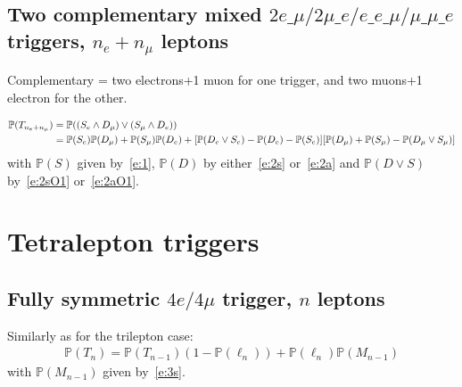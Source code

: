 \documentclass{article}
\newcommand{\pro}{\ensuremath{\mathbb{P}}}
\begin{document}
\subsection{Two complementary mixed $2e\_\mu/2\mu\_e/e\_e\_\mu/\mu\_\mu\_e$ triggers, $n_e+n_\mu$ leptons}

Complementary = two electrons+1 muon for one trigger, and two muons+1 electron for the other. 

\begin{align}
\pro(T_{n_e+n_\mu}) &= \pro((S_e\wedge D_\mu) \vee (S_\mu\wedge D_e))\notag\\
&= \pro(S_e)\pro(D_\mu) + \pro(S_\mu)\pro(D_e) 
+ [\pro(D_e\vee S_e) - \pro(D_e)-\pro(S_e)]
[\pro(D_\mu)+\pro(S_\mu)-\pro(D_\mu\vee S_\mu)]
\end{align}
with $\pro(S)$ given by~\ref{e:1}, $\pro(D)$ by either~\ref{e:2s} or~\ref{e:2a} 
and $\pro(D\vee S)$ by~\ref{e:2sO1} or~\ref{e:2aO1}.

\section{Tetralepton triggers}

\subsection{Fully symmetric $4e/4\mu$ trigger, $n$ leptons}
Similarly as for the trilepton case:
\begin{align}
\pro(T_n) = \pro(T_{n-1})(1-\pro(\ell_n)) + \pro(\ell_n)\pro(M_{n-1})
\end{align}
with $\pro(M_{n-1})$ given by~\ref{e:3s}. 
\end{document}
